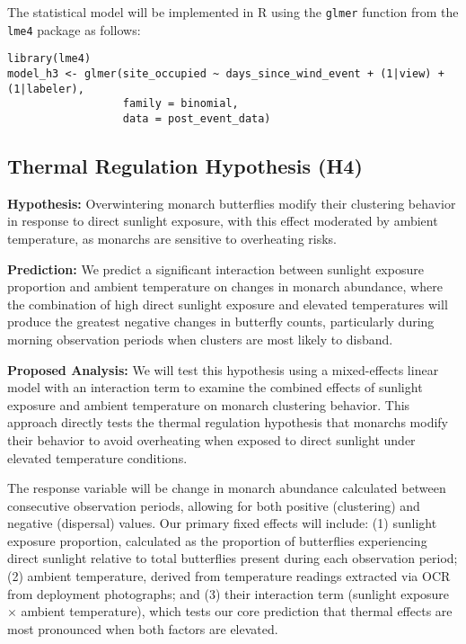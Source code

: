 The statistical model will be implemented in R using the \texttt{glmer} function from the \texttt{lme4} package as follows:

\begin{verbatim}
library(lme4)
model_h3 <- glmer(site_occupied ~ days_since_wind_event + (1|view) + (1|labeler),
                  family = binomial,
                  data = post_event_data)
\end{verbatim}

\subsection{Thermal Regulation Hypothesis (H4)}

\textbf{Hypothesis:} Overwintering monarch butterflies modify their clustering behavior in response to direct sunlight exposure, with this effect moderated by ambient temperature, as monarchs are sensitive to overheating risks.

\textbf{Prediction:} We predict a significant interaction between sunlight exposure proportion and ambient temperature on changes in monarch abundance, where the combination of high direct sunlight exposure and elevated temperatures will produce the greatest negative changes in butterfly counts, particularly during morning observation periods when clusters are most likely to disband.

\textbf{Proposed Analysis:}
We will test this hypothesis using a mixed-effects linear model with an interaction term to examine the combined effects of sunlight exposure and ambient temperature on monarch clustering behavior. This approach directly tests the thermal regulation hypothesis that monarchs modify their behavior to avoid overheating when exposed to direct sunlight under elevated temperature conditions.

The response variable will be change in monarch abundance calculated between consecutive observation periods, allowing for both positive (clustering) and negative (dispersal) values. Our primary fixed effects will include: (1) sunlight exposure proportion, calculated as the proportion of butterflies experiencing direct sunlight relative to total butterflies present during each observation period; (2) ambient temperature, derived from temperature readings extracted via OCR from deployment photographs; and (3) their interaction term (sunlight exposure $\times$ ambient temperature), which tests our core prediction that thermal effects are most pronounced when both factors are elevated.

